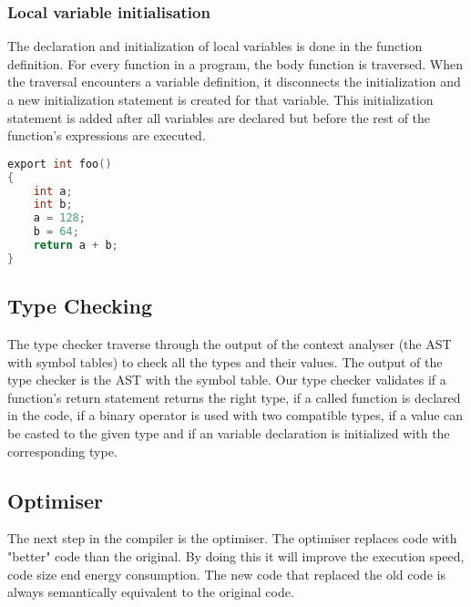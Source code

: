 \documentclass[hidelinks]{uva-inf-article}
\begin{document}
\subsubsection{Local variable initialisation}
The declaration and initialization of local variables is done in the function definition.
For every function in a program, the body function is traversed. 
When the traversal encounters a variable definition, it disconnects the initialization and a new initialization statement is created for that variable.
This initialization statement is added after all variables are declared but before the rest of the function's expressions are executed.

\begin{lstlisting}[basicstyle=\small, language=C, label=lst:code-4, caption=Output of local variable initialisation, captionpos=b]    
export int foo() 
{
    int a;
    int b;
    a = 128;
    b = 64;
    return a + b;
}
\end{lstlisting}

\newpage
\subsection{Type Checking}
The type checker traverse through the output of the context analyser (the AST with symbol tables) 
to check all the types and their values. The output of the type checker is the AST with the symbol table.
Our type checker validates if a function's return statement returns the right type, 
if a called function is declared in the code, if a binary operator is used with two compatible types, 
if a value can be casted to the given type and if an variable declaration is initialized with the corresponding type.

\subsection{Optimiser}
The next step in the compiler is the optimiser. The optimiser replaces code with "better" code
than the original. By doing this it will improve the execution speed, code size end energy
consumption. The new code that replaced the old code is always semantically equivalent to the 
original code.

\end{document}
